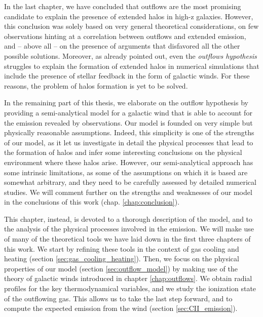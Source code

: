 In the last chapter, we have concluded that outflows are the most promising candidate to explain the presence of extended \CII halos in high-z galaxies. However, this conclusion was solely based on very general theoretical considerations, on few observations hinting at a correlation between outflows and extended \CII emission, and -- above all -- on the presence of arguments that disfavored all the other possible solutions. Moreover, as already pointed out, even the \textit{outflows hypothesis} struggles to explain the formation of extended \CII halos in numerical simulations that include the presence of stellar feedback in the form of galactic winds. For these reasons, the problem of \CII halos formation is yet to be solved. 

In the remaining part of this thesis, we elaborate on the outflow hypothesis by providing a semi-analytical model for a galactic wind that is able to account for the \CII emission revealed by observations. Our model is founded on very simple but physically reasonable assumptions. Indeed, this simplicity is one of the strengths of our model, as it let us investigate in detail the physical processes that lead to the formation of \CII halos and infer some interesting conclusions on the physical environment where these halos arise. However, our semi-analytical approach has some intrinsic limitations, as some of the assumptions on which it is based are somewhat arbitrary, and they need to be carefully assessed by detailed numerical studies. We will comment further on the strengths and weaknesses of our model in the conclusions of this work (chap. \ref{chap:conclusion}).

This chapter, instead, is devoted to a thorough description of the model, and to the analysis of the physical processes involved in the \CII emission. We will make use of many of the theoretical tools we have laid down in the first three chapters of this work. We start by refining these tools in the context of gas cooling and heating (section \ref{sec:gas_cooling_heating}). Then, we focus on the physical properties of our model (section \ref{sec:outflow_model}) by making use of the theory of galactic winds introduced in chapter \ref{chap:outflows}. We obtain radial profiles for the key thermodynamical variables, and we study the ionization state of the outflowing gas. This allows us to take the last step forward, and to compute the expected \CII emission from the wind (section \ref{sec:CII_emission}).


